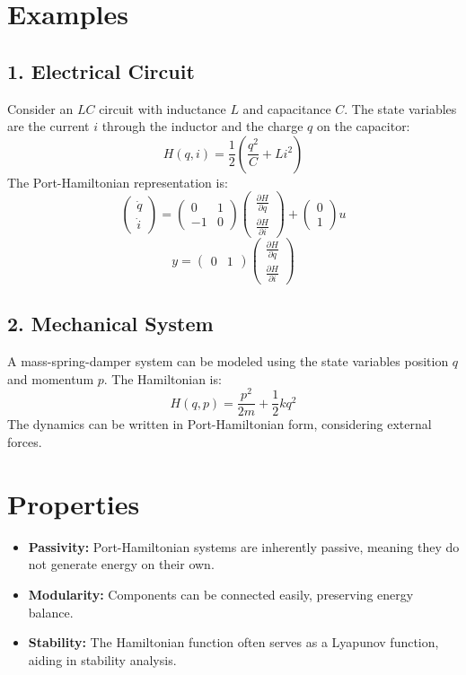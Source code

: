 \section{Examples}
\subsection{1. Electrical Circuit}
Consider an $LC$ circuit with inductance $L$ and capacitance $C$. The state variables are the current $i$ through the inductor and the charge $q$ on the capacitor:
\[
H(q, i) = \frac{1}{2} \left( \frac{q^2}{C} + L i^2 \right)
\]
The Port-Hamiltonian representation is:
\[
\begin{pmatrix} \dot{q} \\ \dot{i} \end{pmatrix} = \begin{pmatrix} 0 & 1 \\ -1 & 0 \end{pmatrix} \begin{pmatrix} \frac{\partial H}{\partial q} \\ \frac{\partial H}{\partial i} \end{pmatrix} + \begin{pmatrix} 0 \\ 1 \end{pmatrix} u
\]
\[
y = \begin{pmatrix} 0 & 1 \end{pmatrix} \begin{pmatrix} \frac{\partial H}{\partial q} \\ \frac{\partial H}{\partial i} \end{pmatrix}
\]

\subsection{2. Mechanical System}
A mass-spring-damper system can be modeled using the state variables position $q$ and momentum $p$. The Hamiltonian is:
\[
H(q, p) = \frac{p^2}{2m} + \frac{1}{2} k q^2
\]
The dynamics can be written in Port-Hamiltonian form, considering external forces.

\section{Properties}
\begin{itemize}
    \item \textbf{Passivity:} Port-Hamiltonian systems are inherently passive, meaning they do not generate energy on their own.
    \item \textbf{Modularity:} Components can be connected easily, preserving energy balance.
    \item \textbf{Stability:} The Hamiltonian function often serves as a Lyapunov function, aiding in stability analysis.
\end{itemize}

